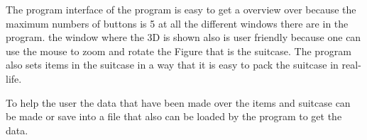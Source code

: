 The program interface of the program is easy to get a overview over because the maximum numbers of buttons is 5 at all the different windows there are in the program. the window where the 3D is shown also is user friendly because one can use the mouse to zoom and rotate the Figure that is the suitcase. The program also sets items in the suitcase in a way that it is easy to pack the suitcase in real-life.

To help the user the data that have been made over the items and suitcase can be made or save into a file that also can be loaded by the program to get the data.